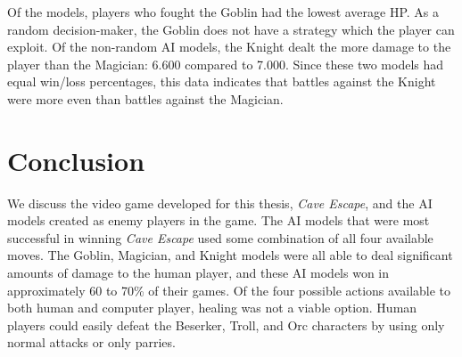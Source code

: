 Of the models, players who fought the Goblin had the lowest average HP. As a random decision-maker, the Goblin does not have a strategy which the player can exploit. Of the non-random AI models, the Knight dealt the more damage to the player than the Magician: 6.600 compared to 7.000. Since these two models had equal win/loss percentages, this data indicates that battles against the Knight were more even than battles against the Magician.

\section{Conclusion}
We discuss the video game developed for this thesis, \textit{Cave Escape}, and the AI models created as enemy players in the game. The AI models that were most successful in winning \textit{Cave Escape} used some combination of all four available moves. The Goblin, Magician, and Knight models were all able to deal significant amounts of damage to the human player, and these AI models won in approximately 60 to 70\% of their games. Of the four possible actions available to both human and computer player, healing was not a viable option. Human players could easily defeat the Beserker, Troll, and Orc characters by using only normal attacks or only parries.